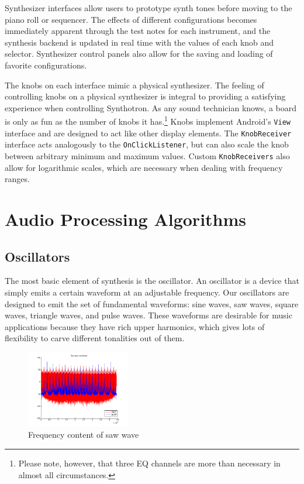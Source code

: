 \documentclass[letterpaper,12pt]{article}
\begin{document}
Synthesizer interfaces allow users to prototype synth tones before moving to the piano roll or sequencer. The effects of different configurations becomes immediately apparent through the test notes for each instrument, and the synthesis backend is updated in real time with the values of each knob and selector. Synthesizer control panels also allow for the saving and loading of favorite configurations.


The knobs on each interface mimic a physical synthesizer. The feeling of controlling knobs on a physical synthesizer is integral to providing a satisfying experience when controlling Synthotron. As any sound technician knows, a board is only as fun as the number of knobs it has.\footnote{Please note, however, that three EQ channels are more than necessary in almost all circumstances.} Knobs implement Android's \texttt{View} interface and are designed to act like other display elements. The \texttt{KnobReceiver} interface acts analogously to the \texttt{OnClickListener}, but can also scale the knob between arbitrary minimum and maximum values. Custom \texttt{KnobReceivers} also allow for logarithmic scales, which are necessary when dealing with frequency ranges.
\section{Audio Processing Algorithms}

\subsection{Oscillators}

The most basic element of synthesis is the oscillator. An oscillator is a device that simply emits a certain waveform at an adjustable frequency. Our oscillators are designed to emit the set of fundamental waveforms: sine waves, saw waves, square waves, triangle waves, and pulse waves. These waveforms are desirable for music applications because they have rich upper harmonics, which gives lots of flexibility to carve different tonalities out of them.

\begin{figure}
\centering
\includegraphics[width=0.4\textwidth]{figures/blep-spectrum.png}
\caption{Frequency content of saw wave}
\label{fig:polyblep-spectrum}
\end{figure}
\end{document}
